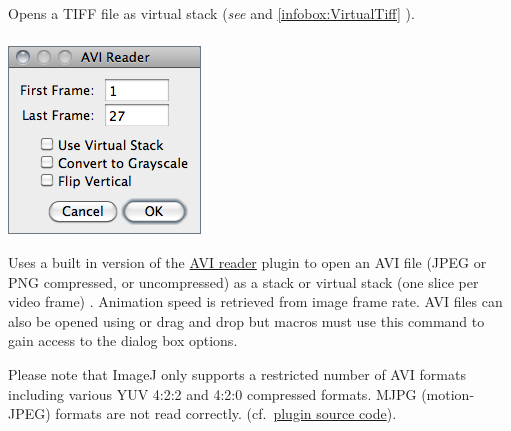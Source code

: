 \subsubsection{\protect{}\label{sub:Import>TIFF-Virtual-Stack}}

Opens a TIFF file as virtual stack (\emph{see}
 and \ref{infobox:VirtualTiff} ).


\subsubsection[\protect\userinterface{AVI\ldots{}}]{\protect{}\label{sub:Import>AVI...}}

\begin{minipage}[c][1\totalheight][t]{0.29\columnwidth}%
\includegraphics[scale=0.55]{images/AviReader}%
\end{minipage}%
\begin{minipage}[c][1\totalheight][t]{0.71\columnwidth}%
Uses a built in version of the \href{http://imagej.nih.gov/ij/plugins/avi-reader.html}{AVI reader}
plugin to open an AVI file (JPEG or PNG compressed, or
uncompressed) as a stack or virtual stack (one slice per video frame)
\cite{C-AviPlugins}. Animation speed is retrieved from image frame
rate. AVI files can also be opened using or
drag and drop but macros must use this command to gain access to the
dialog box options.\medskip{}


Please note that ImageJ only supports a restricted number of AVI formats
including various YUV 4:2:2 and 4:2:0 compressed formats. MJPG
(motion-JPEG) formats are not read correctly. (cf.\ \href{http://imagej.nih.gov/ij/source/ij/plugin/AVI_Reader.java}{plugin source code}).%
\end{minipage}

\medskip{}


